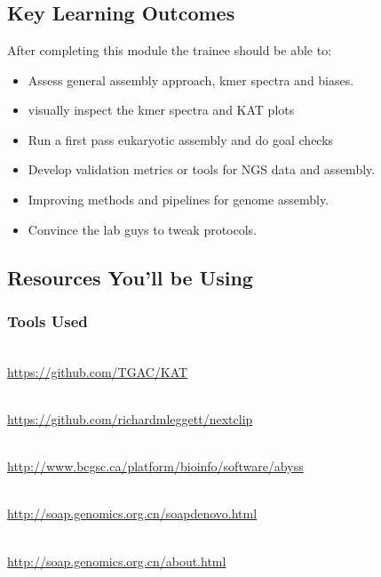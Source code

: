
\chapter{\moduleTitle}
\newpage


\section{Key Learning Outcomes}

After completing this module the trainee should be able to:
\begin{itemize}
  \item Assess general assembly approach, kmer spectra and biases.
  \item visually inspect the kmer spectra and KAT plots
  \item Run a first pass eukaryotic assembly and do goal checks 
  \item Develop validation metrics or tools for NGS data and assembly.
  \item Improving methods and pipelines for genome assembly.
  \item Convince the lab guys to tweak protocols.
\end{itemize}

\section{Resources You'll be Using}
 
\subsection{Tools Used}
\begin{description}[style=multiline,labelindent=0cm,align=left,leftmargin=0.5cm]
  \item[Kmer Analysis Tool kit]\hfill\\
  	\url{https://github.com/TGAC/KAT}
  \item[Nextclip]\hfill\\
  	\url{https://github.com/richardmleggett/nextclip}
  \item[Abyss]\hfill\\
  	\url{http://www.bcgsc.ca/platform/bioinfo/software/abyss}
  \item[Soap Denovo]\hfill\\
  	\url{http://soap.genomics.org.cn/soapdenovo.html}
  \item[SOAPec]\hfill\\
  	\url{http://soap.genomics.org.cn/about.html}
\end{description}

